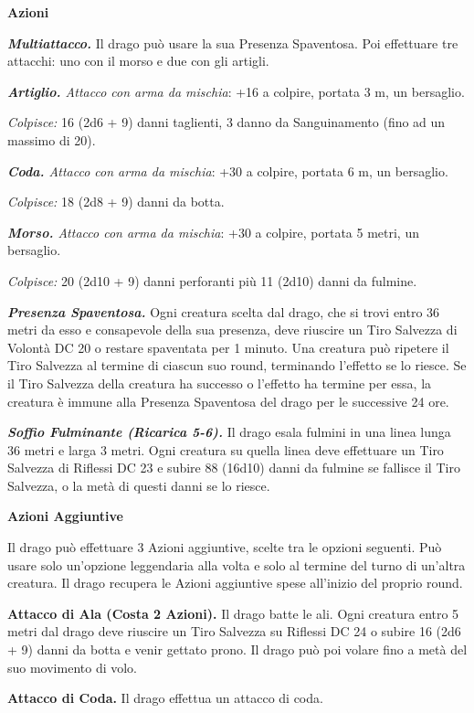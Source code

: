 \begin{multicols}{2}
\textbf{Azioni}

\textit{\textbf{Multiattacco.}} Il drago può usare la sua Presenza Spaventosa. Poi effettuare tre attacchi: uno con il morso e due con gli artigli.

\textit{\textbf{Artiglio.} Attacco con arma da mischia}: +16 a colpire,
portata 3 m, un bersaglio.

\textit{Colpisce:} 16 (2d6 + 9) danni taglienti, 3 danno da Sanguinamento (fino ad un massimo di 20).

\textit{\textbf{Coda.} Attacco con arma da mischia}: +30 a colpire, portata 6 m, un bersaglio.

\textit{Colpisce:} 18 (2d8 + 9) danni da botta.

\textit{\textbf{Morso.} Attacco con arma da mischia}: +30 a colpire, portata 5 metri, un bersaglio.

\textit{Colpisce:} 20 (2d10 + 9) danni perforanti più 11 (2d10) danni da fulmine.

\textit{\textbf{Presenza Spaventosa.}} Ogni creatura scelta dal drago, che si trovi entro 36 metri da esso e consapevole della sua presenza, deve riuscire un Tiro Salvezza di Volontà DC 20 o restare spaventata per 1 minuto. Una creatura può ripetere il Tiro Salvezza al termine di ciascun suo round, terminando l'effetto se lo riesce. Se il Tiro Salvezza della creatura ha successo o l'effetto ha termine per essa, la creatura è immune alla Presenza Spaventosa del drago per le successive 24 ore.

\textit{\textbf{Soffio Fulminante (Ricarica 5-6).}} Il drago esala fulmini in una linea lunga 36 metri e larga 3 metri. Ogni creatura su quella linea deve effettuare un Tiro Salvezza di Riflessi DC 23 e subire 88 (16d10) danni da fulmine se fallisce il Tiro Salvezza, o la metà di questi danni se lo riesce.

\textbf{Azioni Aggiuntive}

Il drago può effettuare 3 Azioni aggiuntive, scelte tra le opzioni seguenti. Può usare solo un'opzione leggendaria alla volta e solo al termine del turno di un'altra creatura. Il drago recupera le Azioni aggiuntive spese all'inizio del proprio round.

\textbf{Attacco di Ala (Costa 2 Azioni).} Il drago batte le ali. Ogni creatura entro 5 metri dal drago deve riuscire un Tiro Salvezza su Riflessi DC 24 o subire 16 (2d6 + 9) danni da botta e venir gettato prono. Il drago può poi volare fino a metà del suo movimento di volo.

\textbf{Attacco di Coda.} Il drago effettua un attacco di coda.


\end{multicols}
